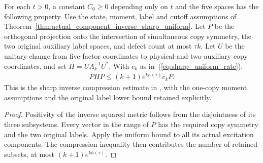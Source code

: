 \begin{theorem}
  \label{thm:actual_low_defect_inverse_sharp_compression}
  \leanok
  For each $t>0$, a constant $C_0\geq0$ depending only on $t$ and
  the five spaces has the following property.
  Use the state, moment, label and cutoff assumptions of
  Theorem~\ref{thm:actual_component_inverse_sharp_uniform}.
  Let $P$ be the orthogonal projection onto the intersection of
  simultaneous copy symmetry, the two original auxiliary label
  spaces, and defect count at most $\tau k$.
  Let $U$ be the unitary change from five-factor coordinates to
  physical-and-two-auxiliary copy coordinates, and set
  $H=UA_k^{-1}U^*$. With $c_k$ as in~(\ref{eq:sharp_uniform_rate}),
  \begin{align*}
    PHP\leq(k+1)e^{kh(\tau)}c_kP.
  \end{align*}
  This is the sharp inverse compression estimate in
  \cite[Section~8]{OpenAI2026AreaLaw}, with the one-copy moment
  assumptions and the original label lower bound retained explicitly.
\end{theorem}
\begin{proof}
  \leanok
  Positivity of the inverse squared metric follows from the
  disjointness of its three subsystems.
  Every vector in the range of $P$ has the required copy symmetry
  and the two original labels. Apply the uniform bound to all its
  actual excitation components. The compression inequality then
  contributes the number of retained subsets, at most
  $(k+1)e^{kh(\tau)}$.
\end{proof}
